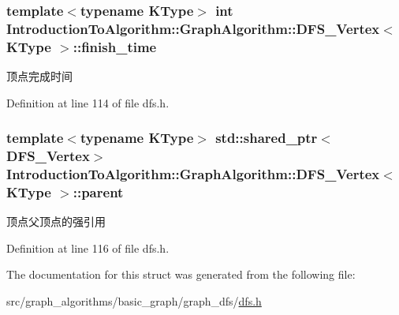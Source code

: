 \subsubsection[{finish\+\_\+time}]{\setlength{\rightskip}{0pt plus 5cm}template$<$typename K\+Type$>$ int {\bf Introduction\+To\+Algorithm\+::\+Graph\+Algorithm\+::\+D\+F\+S\+\_\+\+Vertex}$<$ K\+Type $>$\+::finish\+\_\+time}\label{struct_introduction_to_algorithm_1_1_graph_algorithm_1_1_d_f_s___vertex_aa0f17c70784c1dcc199487e519814e61}
顶点完成时间 

Definition at line 114 of file dfs.\+h.

\hypertarget{struct_introduction_to_algorithm_1_1_graph_algorithm_1_1_d_f_s___vertex_ad243c81b3c0705a136b6a1e5debdb6ed}{}
\subsubsection[{parent}]{\setlength{\rightskip}{0pt plus 5cm}template$<$typename K\+Type$>$ std\+::shared\+\_\+ptr$<${\bf D\+F\+S\+\_\+\+Vertex}$>$ {\bf Introduction\+To\+Algorithm\+::\+Graph\+Algorithm\+::\+D\+F\+S\+\_\+\+Vertex}$<$ K\+Type $>$\+::parent}\label{struct_introduction_to_algorithm_1_1_graph_algorithm_1_1_d_f_s___vertex_ad243c81b3c0705a136b6a1e5debdb6ed}
顶点父顶点的强引用 

Definition at line 116 of file dfs.\+h.



The documentation for this struct was generated from the following file\+:\begin{DoxyCompactItemize}
\item 
src/graph\+\_\+algorithms/basic\+\_\+graph/graph\+\_\+dfs/\hyperlink{dfs_8h}{dfs.\+h}\end{DoxyCompactItemize}
